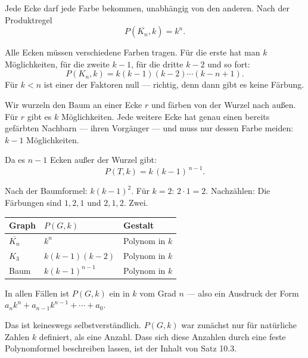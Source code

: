 \begin{merksatz}
Jede Ecke darf jede Farbe bekommen, unabhängig von den anderen. Nach der Produktregel
\[ P(\overline{K_n}, k) = k^n . \]

Alle Ecken müssen verschiedene Farben tragen. Für die erste hat man $k$ Möglichkeiten, für die zweite $k-1$, für die dritte $k-2$ und so fort:
\[ P(K_n, k) = k(k-1)(k-2)\cdots(k-n+1) . \]
Für $k < n$ ist einer der Faktoren null --- richtig, denn dann gibt es keine Färbung.

Wir wurzeln den Baum an einer Ecke $r$ und färben von der Wurzel nach außen. Für $r$ gibt es $k$ Möglichkeiten. Jede weitere Ecke hat genau einen bereits gefärbten Nachbarn --- ihren Vorgänger --- und muss nur dessen Farbe meiden: $k-1$ Möglichkeiten.

Da es $n-1$ Ecken außer der Wurzel gibt:
\[ P(T, k) = k\,(k-1)^{\,n-1} . \]

Nach der Baumformel: $k(k-1)^2$. Für $k=2$: $2 \cdot 1 = 2$. Nachzählen: Die Färbungen sind $1,2,1$ und $2,1,2$. Zwei. \checkmark
\end{merksatz}

\begin{merksatz}
\begin{center}
\renewcommand{\arraystretch}{1.48}
\begin{tabular}{@{}P{2.4cm}P{3.4cm}P{2.6cm}@{}}
\toprule
\textbf{Graph} & $P(G,k)$ & \textbf{Gestalt}\\
\midrule
$\overline{K_n}$ & $k^n$ & Polynom in $k$\\
$K_3$ & $k(k-1)(k-2)$ & Polynom in $k$\\
Baum & $k(k-1)^{n-1}$ & Polynom in $k$\\
\bottomrule
\end{tabular}
\end{center}

In allen Fällen ist $P(G,k)$ ein  in $k$ vom Grad $n$ --- also ein Ausdruck der Form $a_nk^n + a_{n-1}k^{n-1} + \cdots + a_0$.

Das ist keineswegs selbstverständlich. $P(G,k)$ war zunächst nur für natürliche Zahlen $k$ definiert, als eine Anzahl. Dass sich diese Anzahlen durch eine feste Polynomformel beschreiben lassen, ist der Inhalt von Satz 10.3.
\end{merksatz}

